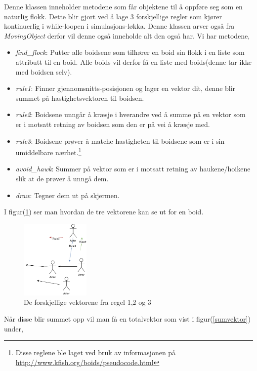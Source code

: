 {Denne klassen inneholder metodene som får objektene til å oppføre seg som en naturlig flokk. Dette blir gjort ved å lage 3 forskjellige regler som kjører kontinuerlig i while-loopen i simulasjons-løkka. Denne klassen arver også fra \emph{MovingObject} derfor vil denne også inneholde alt den også har. Vi har metodene,

\begin{itemize}
    \item \emph{find\_flock}: Putter alle boidsene som tilhører en boid sin flokk i en liste som attributt til en boid. Alle boids vil derfor få en liste med boids(denne tar ikke med boidsen selv).
    \item \emph{rule1}: Finner gjennomsnitts-posisjonen og lager en vektor dit, denne blir summet på hastighetsvektoren til boidsen.
    \item \emph{rule2}: Boidsene unngår å kræsje i hverandre ved å summe på en vektor som er i motsatt retning av boidsen som den er på vei å kræsje med.
    \item \emph{rule3}: Boidsene prøver å matche hastigheten til boidsene som er i sin umiddelbare nærhet.\footnote{Disse reglene ble laget ved bruk av informasjonen på \url{http://www.kfish.org/boids/pseudocode.html}}
    \item \emph{avoid\_hawk}: Summer på vektor som er i motsatt retning av haukene/hoikene slik at de prøver å unngå dem.
    \item \emph{draw}: Tegner dem ut på skjermen.
\end{itemize}

I figur(\ref{rules}) ser man hvordan de tre vektorene kan se ut for en boid.
\begin{figure}[hbt!]
{\centering
    \includegraphics[width=0.30\textwidth]{rules.pdf}
    \caption{De forskjellige vektorene fra regel 1,2 og 3}
    \label{rules}
\par}
\end{figure}

Når disse blir summet opp vil man få en totalvektor som vist i figur(\ref{sumvektor}) under,

}
